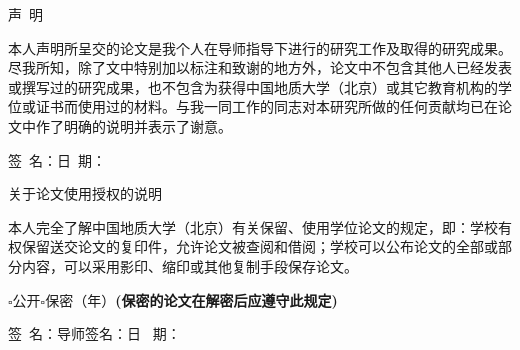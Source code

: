 ﻿%

{
\clearpage
\thispagestyle{empty}
\heiti \LARGE \centering 声~明
\vskip 15pt
\songti \normalsize \raggedright \hspace{2em}本人声明所呈交的论文是我个人在导师指导下进行的研究工作及取得的研究成果。尽我所知，除了文中特别加以标注和致谢的地方外，论文中不包含其他人已经发表或撰写过的研究成果，也不包含为获得中国地质大学（北京）或其它教育机构的学位或证书而使用过的材料。与我一同工作的同志对本研究所做的任何贡献均已在论文中作了明确的说明并表示了谢意。

\vskip 60pt
\raggedleft \fontsize{13pt}{0pt}\selectfont 签~名：\underline{\hspace{3cm}}日~期： \underline{\hspace{3cm}}

\vskip 100pt
\centering \heiti \LARGE 关于论文使用授权的说明
\vskip 10pt

\songti \normalsize \raggedright \hspace{2em}本人完全了解中国地质大学（北京）有关保留、使用学位论文的规定，即：学校有权保留送交论文的复印件，允许论文被查阅和借阅；学校可以公布论文的全部或部分内容，可以采用影印、缩印或其他复制手段保存论文。
\vskip 20pt

\hspace{2em}$\square$公开\hspace{0.5cm}$\square$保密（\underline{\hspace{1cm}}年）\hspace{1cm}\fontsize{13pt}{0pt}\selectfont \textbf{(保密的论文在解密后应遵守此规定)}

\vskip 60pt
\songti \fontsize{13pt}{0pt}\selectfont 签~名：\underline{\hspace{3cm}}导师签名：\underline{\hspace{3cm}}日~ 期：\underline{\hspace{3cm}}	    	
}